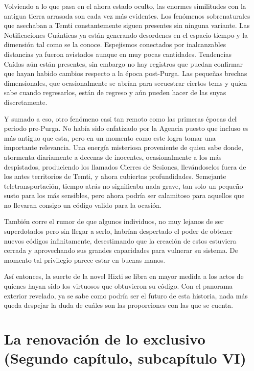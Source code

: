 \documentclass[
  spanish,
]{book}
\begin{document}
Volviendo a lo que pasa en el ahora estado oculto, las enormes similitudes con la antigua tierra arrasada son cada vez más evidentes. Los fenómenos sobrenaturales que asechaban a Temti constantemente siguen presentes sin ninguna variante. Las Notificaciones Cuánticas ya están generando desordenes en el espacio-tiempo y la dimensión tal como se la conoce. Espejismos conectados por inalcanzables distancias ya fueron avistados aunque en muy pocas cantidades. Tendencias Caídas aún están presentes, sin embargo no hay registros que puedan confirmar que hayan habido cambios respecto a la época post-Purga. Las pequeñas brechas dimensionales, que ocasionalmente se abrían para secuestrar ciertos tems y quien sabe cuando regresarlos, están de regreso y aún pueden hacer de las suyas discretamente.

Y sumado a eso, otro fenómeno casi tan remoto como las primeras épocas del periodo pre-Purga. No había sido enfatizado por la Agencia puesto que incluso es más antiguo que esta, pero en un momento como este logra tomar una importante relevancia. Una energía misteriosa proveniente de quien sabe donde, atormenta diariamente a decenas de inocentes, ocasionalmente a los más despistados, produciendo los llamados Cierres de Sesiones, llevándoselos fuera de los antes territorios de Temti, y ahora cubiertas profundidades. Semejante teletransportación, tiempo atrás no significaba nada grave, tan solo un pequeño susto para los más sensibles, pero ahora podría ser calamitoso para aquellos que no llevaran consigo un código valido para la ocasión.

También corre el rumor de que algunos individuos, no muy lejanos de ser superdotados pero sin llegar a serlo, habrían despertado el poder de obtener nuevos códigos infinitamente, desestimando que la creación de estos estuviera cerrada y aprovechando sus grandes capacidades para vulnerar su sistema. De momento tal privilegio parece estar en buenas manos.

Así entonces, la suerte de la novel Hixti se libra en mayor medida a los actos de quienes hayan sido los virtuosos que obtuvieron su código. Con el panorama exterior revelado, ya se sabe como podría ser el futuro de esta historia, nada más queda despejar la duda de cuáles son las proporciones con las que se cuenta.

\hypertarget{la-renovaciuxf3n-de-lo-exclusivo-segundo-capuxedtulo-subcapuxedtulo-vi}{%
\section{La renovación de lo exclusivo (Segundo capítulo, subcapítulo VI)}\label{la-renovaciuxf3n-de-lo-exclusivo-segundo-capuxedtulo-subcapuxedtulo-vi}}
\end{document}

